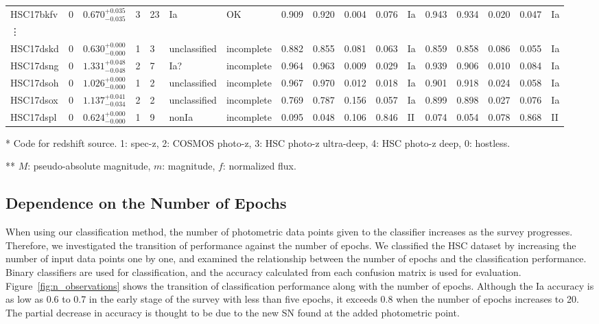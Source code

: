 \documentclass[useamsfonts]{pasj01}
\begin{document}
\begin{table}[htbp]
{\begin{tabular}{p{4em}p{1em}p{4.0em}p{2.1em}|p{0.6em}p{4.0em}p{4.5em}|p{2.9em}|p{1.2em}p{1.2em}p{1.2em}p{0.6em}|p{2.9em}|p{1.2em}p{1.2em}p{1.2em}p{0.6em}}
HSC17bkfv &     0 &    $0.670_{-0.035}^{+0.035}$ &         3 &   23 &     Ia &     OK &    0.909 &    0.920 &    0.004 &    0.076 &      Ia &    0.943 &    0.934 &    0.020 &    0.047 &      Ia \\
\vdots & & & & & & & & & & & & & & & &\\
HSC17dskd &     0 &    $0.630_{-0.000}^{+0.000}$ &         1 &    3 &  unclassified &   incomplete &    0.882 &    0.855 &    0.081 &    0.063 &      Ia &    0.859 &    0.858 &    0.086 &    0.055 &      Ia \\
HSC17dsng &     0 &    $1.331_{-0.048}^{+0.048}$ &         2 &    7 &    Ia? &   incomplete &    0.964 &    0.963 &    0.009 &    0.029 &      Ia &    0.939 &    0.906 &    0.010 &    0.084 &      Ia \\
HSC17dsoh &     0 &    $1.026_{-0.000}^{+0.000}$ &         1 &    2 &  unclassified &   incomplete &    0.967 &    0.970 &    0.012 &    0.018 &      Ia &    0.901 &    0.918 &    0.024 &    0.058 &      Ia \\
HSC17dsox &     0 &    $1.137_{-0.034}^{+0.041}$ &         2 &    2 &  unclassified &   incomplete &    0.769 &    0.787 &    0.156 &    0.057 &      Ia &    0.899 &    0.898 &    0.027 &    0.076 &      Ia \\
HSC17dspl &     0 &    $0.624_{-0.000}^{+0.000}$ &         1 &    9 &  nonIa &   incomplete &    0.095 &    0.048 &    0.106 &    0.846 &      II &    0.074 &    0.054 &    0.078 &    0.868 &      II \\
\hline
\end{tabular}
}\label{tab:h_results}
\begin{tabnote}
* Code for redshift source.
1: spec-z, 2: COSMOS photo-z, 3: HSC photo-z ultra-deep, 4: HSC photo-z deep, 0: hostless.

** $M$: pseudo-absolute magnitude, $m$: magnitude, $f$: normalized flux.
\end{tabnote}
\end{table}
%
%
\subsection{Dependence on the Number of Epochs}
%
When using our classification method, the number of photometric data points given to the classifier increases as the survey progresses.
Therefore, we investigated the transition of performance against the number of epochs.
We classified the HSC dataset by increasing the number of input data points one by one, and examined the relationship between the number of epochs and the classification performance.
Binary classifiers are used for classification, and the accuracy calculated from each confusion matrix is used for evaluation.
Figure\ \ref{fig:n_observations} shows the transition of classification performance along with the number of epochs.
Although the Ia accuracy is as low as 0.6 to 0.7 in the early stage of the survey with less than five epochs, it exceeds 0.8 when the number of epochs increases to 20.
The partial decrease in accuracy is thought to be due to the new SN found at the added photometric point.
\end{document}
